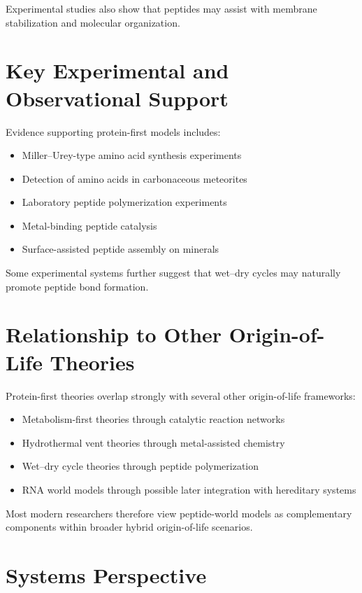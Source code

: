 \documentclass[
  oneside]{book}
\providecommand{\tightlist}{%
  \setlength{\itemsep}{0pt}\setlength{\parskip}{0pt}}
\begin{document}
Experimental studies also show that peptides may assist with membrane stabilization and molecular organization.

\section{Key Experimental and Observational Support}\label{key-experimental-and-observational-support-6}

Evidence supporting protein-first models includes:

\begin{itemize}
\tightlist
\item
  Miller--Urey-type amino acid synthesis experiments
\item
  Detection of amino acids in carbonaceous meteorites
\item
  Laboratory peptide polymerization experiments
\item
  Metal-binding peptide catalysis
\item
  Surface-assisted peptide assembly on minerals
\end{itemize}

Some experimental systems further suggest that wet--dry cycles may naturally promote peptide bond formation.

\section{Relationship to Other Origin-of-Life Theories}\label{relationship-to-other-origin-of-life-theories}

Protein-first theories overlap strongly with several other origin-of-life frameworks:

\begin{itemize}
\tightlist
\item
  Metabolism-first theories through catalytic reaction networks
\item
  Hydrothermal vent theories through metal-assisted chemistry
\item
  Wet--dry cycle theories through peptide polymerization
\item
  RNA world models through possible later integration with hereditary systems
\end{itemize}

Most modern researchers therefore view peptide-world models as complementary components within broader hybrid origin-of-life scenarios.

\section{Systems Perspective}\label{systems-perspective-6}
\end{document}
